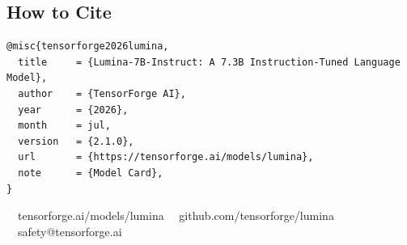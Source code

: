 \vspace{2pt}

\subsection*{How to Cite}

\begin{lstlisting}[caption={BibTeX citation.}]
@misc{tensorforge2026lumina,
  title     = {Lumina-7B-Instruct: A 7.3B Instruction-Tuned Language Model},
  author    = {TensorForge AI},
  year      = {2026},
  month     = jul,
  version   = {2.1.0},
  url       = {https://tensorforge.ai/models/lumina},
  note      = {Model Card},
}
\end{lstlisting}

\vspace{4pt}
{\small\color{medium}\faGlobe~~tensorforge.ai/models/lumina\qquad
\faGithub~~github.com/tensorforge/lumina\qquad
\faEnvelope~~safety@tensorforge.ai}
